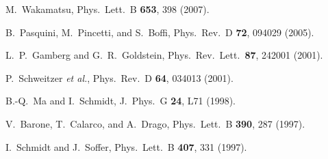 \documentclass[aps,prd,twocolumn,groupedaddress,showpacs,superscriptaddress,floatfix,nofootinbib,10pt]{revtex4-1}
\begin{document}
\begin{thebibliography}{}
  M.~Wakamatsu,
  Phys.\ Lett.\ B {\bf 653}, 398 (2007).


  B.~Pasquini, M.~Pincetti, and S.~Boffi,
  Phys.\ Rev.\ D {\bf 72}, 094029 (2005).


  L.~P.~Gamberg and G.~R.~Goldstein,
  Phys.\ Rev.\ Lett.\  {\bf 87}, 242001 (2001).


  P.~Schweitzer {\it et al.}, %
  Phys.\ Rev.\ D {\bf 64}, 034013 (2001).


  B.-Q.~Ma and I.~Schmidt,
  J.\ Phys.\ G {\bf 24}, L71 (1998).


  V.~Barone, T.~Calarco, and A.~Drago,
  Phys.\ Lett.\ B {\bf 390}, 287 (1997).


  I.~Schmidt and J.~Soffer,
  Phys.\ Lett.\ B {\bf 407}, 331 (1997).



\end{thebibliography}
\end{document}
